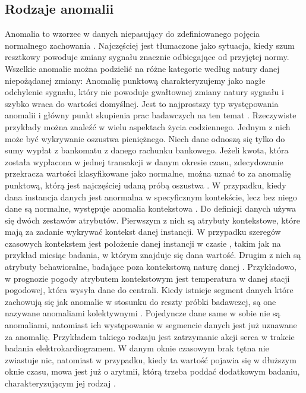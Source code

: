 \documentclass[a4paper,twoside,12pt]{book}
\begin{document}
	\subsection{Rodzaje anomalii}
	Anomalia to wzorzec w danych niepasujący do zdefiniowanego pojęcia normalnego zachowania \cite{chandola2009anomaly}. Najczęściej jest tłumaczone jako sytuacja, kiedy szum resztkowy powoduje zmiany sygnału znacznie odbiegające od przyjętej normy. Wszelkie anomalie można podzielić na różne kategorie według natury danej niepożądanej zmiany:
	Anomalię punktową charakteryzujemy jako nagłe odchylenie sygnału, który nie powoduje gwałtownej zmiany natury sygnału i szybko wraca do wartości domyślnej. Jest to najprostszy typ występowania anomalii i główny punkt skupienia prac badawczych na ten temat \cite{chandola2009anomaly}. Rzeczywiste przykłady można znaleźć w wielu aspektach życia codziennego. Jednym z nich może być wykrywanie oszustwa pieniężnego. Niech dane odnoszą się tylko do sumy wypłat z bankomatu z danego rachunku bankowego. Jeżeli kwota, która została wypłacona w jednej transakcji w danym okresie czasu, zdecydowanie przekracza wartości klasyfikowane jako normalne, można uznać to za anomalię punktową, którą jest najczęściej udaną próbą oszustwa \cite{chandola2009anomaly}.
	W przypadku, kiedy dana instancja danych jest anormalna w specyficznym kontekście, lecz bez niego dane są normalne, występuje anomalia kontekstowa \cite{chandola2009anomaly}. Do definicji danych używa się dwóch zestawów atrybutów. Pierwszym z nich są atrybuty kontekstowe, które mają za zadanie wykrywać kontekst danej instancji. W przypadku szeregów czasowych kontekstem jest położenie danej instancji w czasie \cite{chandola2009anomaly2}, takim jak na przykład miesiąc badania, w którym znajduje się dana wartość. Drugim z nich są atrybuty behawioralne, badające poza kontekstową naturę danej \cite{chandola2009anomaly}. Przykładowo, w prognozie pogody atrybutem kontekstowym jest temperatura w danej stacji pogodowej, która wysyła dane do centrali.
	Kiedy istnieje segment danych które zachowują się jak anomalie w stosunku do reszty próbki badawczej, są one nazywane anomaliami kolektywnymi \cite{chandola2009anomaly}. Pojedyncze dane same w sobie nie są anomaliami, natomiast ich występowanie w segmencie danych jest już uznawane za anomalię. Przykładem takiego rodzaju jest zatrzymanie akcji serca w trakcie badania elektrokardiogramem. W danym oknie czasowym brak tętna nie zwiastuje nic, natomiast w przypadku, kiedy ta wartość pojawia się w dłuższym oknie czasu, mowa jest już o arytmii, którą trzeba poddać dodatkowym badaniu, charakteryzującym jej rodzaj \cite{chandola2009anomaly}.
	
\end{document}
